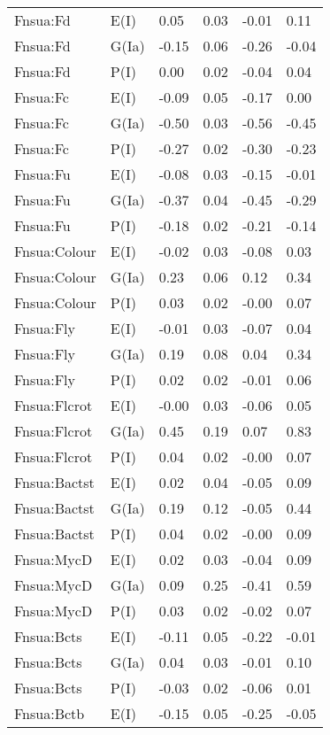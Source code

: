 \begin{center}
\begin{longtable}{|p{1.1in}|p{0.7in}|p{0.7in}|p{0.6in}|p{0.6in}|p{0.6in}|}
  Fnsua:Fd & E(I) & 0.05 & 0.03 & -0.01 & 0.11 \\ 
  Fnsua:Fd & G(Ia) & -0.15 & 0.06 & -0.26 & -0.04 \\ 
  Fnsua:Fd & P(I) & 0.00 & 0.02 & -0.04 & 0.04 \\ 
  Fnsua:Fc & E(I) & -0.09 & 0.05 & -0.17 & 0.00 \\ 
  Fnsua:Fc & G(Ia) & -0.50 & 0.03 & -0.56 & -0.45 \\ 
  Fnsua:Fc & P(I) & -0.27 & 0.02 & -0.30 & -0.23 \\ 
  Fnsua:Fu & E(I) & -0.08 & 0.03 & -0.15 & -0.01 \\ 
  Fnsua:Fu & G(Ia) & -0.37 & 0.04 & -0.45 & -0.29 \\ 
  Fnsua:Fu & P(I) & -0.18 & 0.02 & -0.21 & -0.14 \\ 
  Fnsua:Colour & E(I) & -0.02 & 0.03 & -0.08 & 0.03 \\ 
  Fnsua:Colour & G(Ia) & 0.23 & 0.06 & 0.12 & 0.34 \\ 
  Fnsua:Colour & P(I) & 0.03 & 0.02 & -0.00 & 0.07 \\ 
  Fnsua:Fly & E(I) & -0.01 & 0.03 & -0.07 & 0.04 \\ 
  Fnsua:Fly & G(Ia) & 0.19 & 0.08 & 0.04 & 0.34 \\ 
  Fnsua:Fly & P(I) & 0.02 & 0.02 & -0.01 & 0.06 \\ 
  Fnsua:Flcrot & E(I) & -0.00 & 0.03 & -0.06 & 0.05 \\ 
  Fnsua:Flcrot & G(Ia) & 0.45 & 0.19 & 0.07 & 0.83 \\ 
  Fnsua:Flcrot & P(I) & 0.04 & 0.02 & -0.00 & 0.07 \\ 
  Fnsua:Bactst & E(I) & 0.02 & 0.04 & -0.05 & 0.09 \\ 
  Fnsua:Bactst & G(Ia) & 0.19 & 0.12 & -0.05 & 0.44 \\ 
  Fnsua:Bactst & P(I) & 0.04 & 0.02 & -0.00 & 0.09 \\ 
  Fnsua:MycD & E(I) & 0.02 & 0.03 & -0.04 & 0.09 \\ 
  Fnsua:MycD & G(Ia) & 0.09 & 0.25 & -0.41 & 0.59 \\ 
  Fnsua:MycD & P(I) & 0.03 & 0.02 & -0.02 & 0.07 \\ 
  Fnsua:Bcts & E(I) & -0.11 & 0.05 & -0.22 & -0.01 \\ 
  Fnsua:Bcts & G(Ia) & 0.04 & 0.03 & -0.01 & 0.10 \\ 
  Fnsua:Bcts & P(I) & -0.03 & 0.02 & -0.06 & 0.01 \\ 
  Fnsua:Bctb & E(I) & -0.15 & 0.05 & -0.25 & -0.05 \\ 

\end{longtable}
\end{center}
